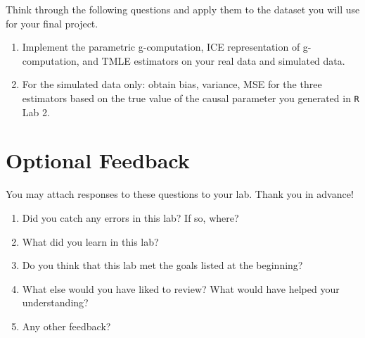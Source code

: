 \documentclass[answers]{exam}
\begin{document}
Think through the following questions and apply them to the dataset you will use for your final project.

\begin{enumerate}
\item Implement the parametric g-computation, ICE representation of g-computation, and TMLE estimators on your real data and simulated data.
\item For the simulated data only: obtain bias, variance, MSE for the three estimators based on the true value of the causal parameter you generated in \texttt{R} Lab 2.
\end{enumerate}


\pagebreak
\section{Optional Feedback}

You may attach responses to these questions to your lab. Thank you in advance!

\begin{enumerate}
\item Did you catch any errors in this lab? If so, where?
\item What did you learn in this lab?
\item Do you think that this lab met the goals listed at the beginning? 
\item What else would you have liked to review? What would have helped your understanding?
\item Any other feedback?
\end{enumerate}
\end{document}
